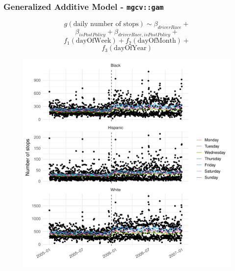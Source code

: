 \documentclass{beamer}
\begin{document}
\begin{frame}
\frametitle{Generalized Additive Model - \texttt{mgcv::gam}}

\begin{multicols}{2}
$$g(\text{daily number of stops}) \sim \beta_{driverRace} + $$
$$\beta_{isPostPolicy}+ \beta_{driverRace, isPostPolicy}+$$
$$ f_1(\text{dayOfWeek}) + f_2(\text{dayOfMonth})+ $$
$$ f_3(\text{dayOfYear})$$


\columnbreak

\begin{figure}
\includegraphics[scale=.3]{figures/gamResults2}
\end{figure}

\end{multicols}

\end{frame}
\end{document}
